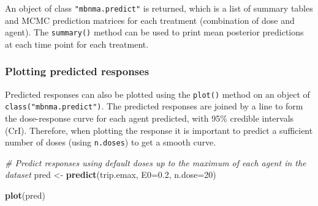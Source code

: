 \documentclass[]{article}
\newenvironment{Shaded}{\begin{snugshade}}{\end{snugshade}}
\newcommand{\CommentTok}[1]{\textcolor[rgb]{0.56,0.35,0.01}{\textit{#1}}}
\newcommand{\DataTypeTok}[1]{\textcolor[rgb]{0.13,0.29,0.53}{#1}}
\newcommand{\DecValTok}[1]{\textcolor[rgb]{0.00,0.00,0.81}{#1}}
\newcommand{\FloatTok}[1]{\textcolor[rgb]{0.00,0.00,0.81}{#1}}
\newcommand{\KeywordTok}[1]{\textcolor[rgb]{0.13,0.29,0.53}{\textbf{#1}}}
\newcommand{\NormalTok}[1]{#1}
\newcommand{\StringTok}[1]{\textcolor[rgb]{0.31,0.60,0.02}{#1}}
\begin{document}
An object of class \texttt{"mbnma.predict"} is returned, which is a list
of summary tables and MCMC prediction matrices for each treatment
(combination of dose and agent). The \texttt{summary()} method can be
used to print mean posterior predictions at each time point for each
treatment.

\begin{Shaded}
\end{Shaded}

\hypertarget{plotting-predicted-responses}{%
\subsubsection{Plotting predicted
responses}\label{plotting-predicted-responses}}

Predicted responses can also be plotted using the \texttt{plot()} method
on an object of \texttt{class("mbnma.predict")}. The predicted responses
are joined by a line to form the dose-response curve for each agent
predicted, with 95\% credible intervals (CrI). Therefore, when plotting
the response it is important to predict a sufficient number of doses
(using \texttt{n.doses}) to get a smooth curve.

\begin{Shaded}
\begin{Highlighting}[]
\CommentTok{# Predict responses using default doses up to the maximum of each agent in the dataset}
\NormalTok{pred <-}\StringTok{ }\KeywordTok{predict}\NormalTok{(trip.emax, }\DataTypeTok{E0=}\FloatTok{0.2}\NormalTok{, }\DataTypeTok{n.dose=}\DecValTok{20}\NormalTok{)}

\KeywordTok{plot}\NormalTok{(pred)}
\end{Highlighting}
\end{Shaded}
\end{document}
